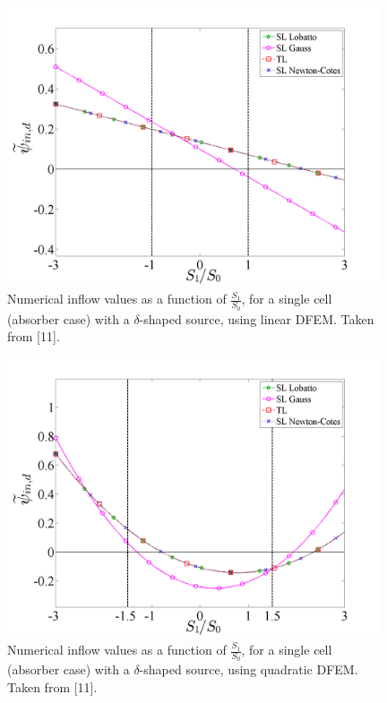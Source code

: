 \begin{figure}[!htp]
\centering
\includegraphics[width=11cm]{chapter2_constant_xs/Final_Inflow_RHS_Comparison_Source_P1_MFP_5.png}
\caption{Numerical inflow values  as a function of $\frac{S_1}{S_0}$, for a single cell (absorber case) with a $\delta$-shaped source, using linear DFEM.  Taken from [11].}
\label{fig:abs_inflow_p1}
\end{figure}
\begin{figure}[!hbp]
\centering
\includegraphics[width=11cm]{chapter2_constant_xs/Final_Inflow_RHS_Comparison_Source_P2_MFP_5.png}
\caption{Numerical inflow values  as a function of $\frac{S_1}{S_0}$, for a single cell (absorber case) with a $\delta$-shaped source, using quadratic DFEM.  Taken from [11].}
\label{fig:abs_inflow_p2}
\end{figure}
